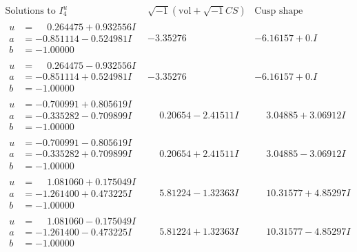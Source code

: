 \documentclass[1p]{elsarticle_modified}
\theoremstyle{definition}
\newcommand{\I}{\sqrt{-1}}
\begin{document}
$$\begin{array}{c|c|c}  
\text{Solutions to }I^u_{4}& \I (\text{vol} + \sqrt{-1}CS) & \text{Cusp shape}\\
 \hline 
\begin{aligned}
u &= \phantom{-}0.264475 + 0.932556 I \\
a &= -0.851114 - 0.524981 I \\
b &= -1.00000\phantom{ +0.000000I}\end{aligned}
 & -3.35276\phantom{ +0.000000I} & -6.16157 + 0. I\phantom{ +0.000000I} \\ \hline\begin{aligned}
u &= \phantom{-}0.264475 - 0.932556 I \\
a &= -0.851114 + 0.524981 I \\
b &= -1.00000\phantom{ +0.000000I}\end{aligned}
 & -3.35276\phantom{ +0.000000I} & -6.16157 + 0. I\phantom{ +0.000000I} \\ \hline\begin{aligned}
u &= -0.700991 + 0.805619 I \\
a &= -0.335282 - 0.709899 I \\
b &= -1.00000\phantom{ +0.000000I}\end{aligned}
 & \phantom{-}0.20654 - 2.41511 I & \phantom{-}3.04885 + 3.06912 I \\ \hline\begin{aligned}
u &= -0.700991 - 0.805619 I \\
a &= -0.335282 + 0.709899 I \\
b &= -1.00000\phantom{ +0.000000I}\end{aligned}
 & \phantom{-}0.20654 + 2.41511 I & \phantom{-}3.04885 - 3.06912 I \\ \hline\begin{aligned}
u &= \phantom{-}1.081060 + 0.175049 I \\
a &= -1.261400 + 0.473225 I \\
b &= -1.00000\phantom{ +0.000000I}\end{aligned}
 & \phantom{-}5.81224 - 1.32363 I & \phantom{-}10.31577 + 4.85297 I \\ \hline\begin{aligned}
u &= \phantom{-}1.081060 - 0.175049 I \\
a &= -1.261400 - 0.473225 I \\
b &= -1.00000\phantom{ +0.000000I}\end{aligned}
 & \phantom{-}5.81224 + 1.32363 I & \phantom{-}10.31577 - 4.85297 I \\ \hline\begin{aligned}

\end{aligned}
\end{array}$$
\end{document}
